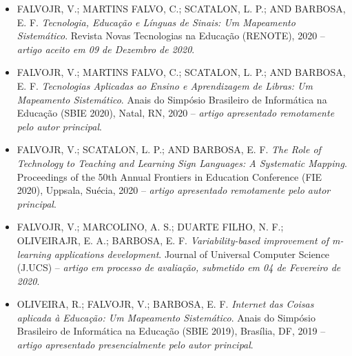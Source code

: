 \begin{itemize}

\item \uppercase{FalvoJr, V.; Martins Falvo, C.; Scatalon, L. P.; and Barbosa, E. F.} \textit{Tecnologia, Educação e Línguas de Sinais: Um Mapeamento Sistemático}. Revista Novas Tecnologias na Educação (RENOTE), 2020 -- \textit{artigo aceito em 09 de Dezembro de 2020}.

\item \uppercase{FalvoJr, V.; Martins Falvo, C.; Scatalon, L. P.; and Barbosa, E. F.} \textit{Tecnologias Aplicadas ao Ensino e Aprendizagem de Libras: Um Mapeamento Sistemático}. Anais do Simpósio Brasileiro de Informática na Educação (SBIE 2020), Natal, RN, 2020 -- \textit{artigo apresentado remotamente pelo autor principal}.

\item \uppercase{FalvoJr, V.; Scatalon, L. P.; and Barbosa, E. F.} \textit{The Role of Technology to Teaching and Learning Sign Languages: A Systematic Mapping}. Proceedings of the 50th Annual Frontiers in Education Conference (FIE 2020), Uppsala, Suécia, 2020 -- \textit{artigo apresentado remotamente pelo autor principal}.

\item \uppercase{FalvoJr, V.; Marcolino, A. S.; Duarte Filho, N. F.; OliveiraJr, E. A.; Barbosa, E. F.} \textit{Variability-based improvement of m-learning applications development}. Journal of Universal Computer Science (J.UCS) -- \textit{artigo em processo de avaliação, submetido em 04 de Fevereiro de 2020}.

\item \uppercase{Oliveira, R.; FalvoJr, V.; Barbosa, E. F.} \textit{Internet das Coisas aplicada à Educação: Um Mapeamento Sistemático}. Anais do Simpósio Brasileiro de Informática na Educação (SBIE 2019), Brasília, DF, 2019 -- \textit{artigo apresentado presencialmente pelo autor principal}.

\end{itemize}